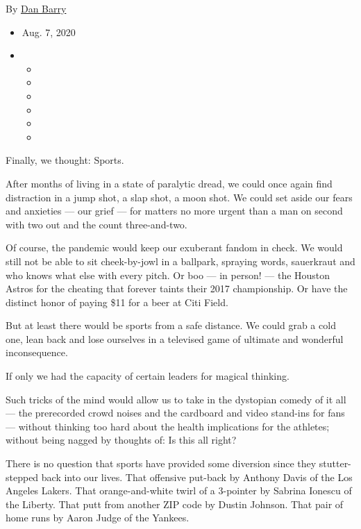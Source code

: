 By \href{https://www.nytimes.com/by/dan-barry}{Dan Barry}

\begin{itemize}
\item
  Aug. 7, 2020
\item
  \begin{itemize}
  \item
  \item
  \item
  \item
  \item
  \item
  \end{itemize}
\end{itemize}

Finally, we thought: Sports.

After months of living in a state of paralytic dread, we could once
again find distraction in a jump shot, a slap shot, a moon shot. We
could set aside our fears and anxieties --- our grief --- for matters no
more urgent than a man on second with two out and the count
three-and-two.

Of course, the pandemic would keep our exuberant fandom in check. We
would still not be able to sit cheek-by-jowl in a ballpark, spraying
words, sauerkraut and who knows what else with every pitch. Or boo ---
in person! --- the Houston Astros for the cheating that forever taints
their 2017 championship. Or have the distinct honor of paying \$11 for a
beer at Citi Field.

But at least there would be sports from a safe distance. We could grab a
cold one, lean back and lose ourselves in a televised game of ultimate
and wonderful inconsequence.

If only we had the capacity of certain leaders for magical thinking.

Such tricks of the mind would allow us to take in the dystopian comedy
of it all --- the prerecorded crowd noises and the cardboard and video
stand-ins for fans --- without thinking too hard about the health
implications for the athletes; without being nagged by thoughts of: Is
this all right?

There is no question that sports have provided some diversion since they
stutter-stepped back into our lives. That offensive put-back by Anthony
Davis of the Los Angeles Lakers. That orange-and-white twirl of a
3-pointer by Sabrina Ionescu of the Liberty. That putt from another ZIP
code by Dustin Johnson. That pair of home runs by Aaron Judge of the
Yankees.


